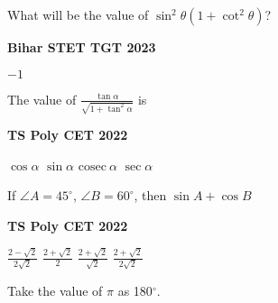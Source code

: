 \documentclass[11pt,paper=a4,answers]{exam}
\begin{document}
\begin{multicols}{2}
\begin{questions}
\columnbreak
\question What will be the value of  $\sin^2 \theta \left(1+\cot^2 \theta \right)$?

\begin{flushright}
\small\textbf{Bihar STET TGT 2023}
\end{flushright}


\begin{choices}
\choice $-1$
\end{choices}
\question The value of $\displaystyle \frac{\tan \alpha}{\sqrt{1+ \tan^2 \alpha} }  $ is
\begin{flushright}
\small\textbf{TS Poly CET 2022}
\end{flushright}


\begin{choices}
\choice $\displaystyle \cos \alpha$
\choice $\displaystyle \sin \alpha$
\choice $\displaystyle \textrm{cosec} \ \alpha$ 
\choice $\displaystyle \sec \alpha$
\end{choices}


\question If $\angle A=45^{\circ}$, $\angle B=60^{\circ}$, then $\sin A + \cos B$
\begin{flushright}
\small\textbf{TS Poly CET 2022}
\end{flushright}
\begin{choices}
\choice $\displaystyle \frac{2-\sqrt{2}}{2\sqrt{2}}$
\choice $\displaystyle \frac{2+\sqrt{2}}{{2}}$
\choice $\displaystyle \frac{2+\sqrt{2}}{\sqrt{2}}$
\choice $\displaystyle \frac{2+\sqrt{2}}{2\sqrt{2}}$
\end{choices}

\end{questions}
\end{multicols}

\begin{center}
\Large{Take the value of $\pi$ as 180${^\circ}$.}
\end{center}

\newpage
\end{document}
